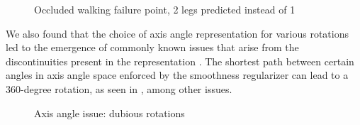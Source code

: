 \begin{figure}[!ht]
    \centering
    \hfil
    \hfil
    \caption{Occluded walking failure point, 2 legs predicted instead of 1}
    \label{fig:humor_bad_occluded_walking}
\end{figure}

We also found that the choice of axis angle representation for various rotations led to the emergence of commonly known issues that arise from the discontinuities present in the representation \cite{aa_6d_angles}. The shortest path between certain angles in axis angle space enforced by the smoothness regularizer can lead to a 360-degree rotation, as seen in , among other issues.

\begin{figure}[!ht]
    \centering
    \hfil
    \hfil
    \caption{Axis angle issue: dubious rotations}
    \label{fig:humor_bad_aa}
\end{figure}

